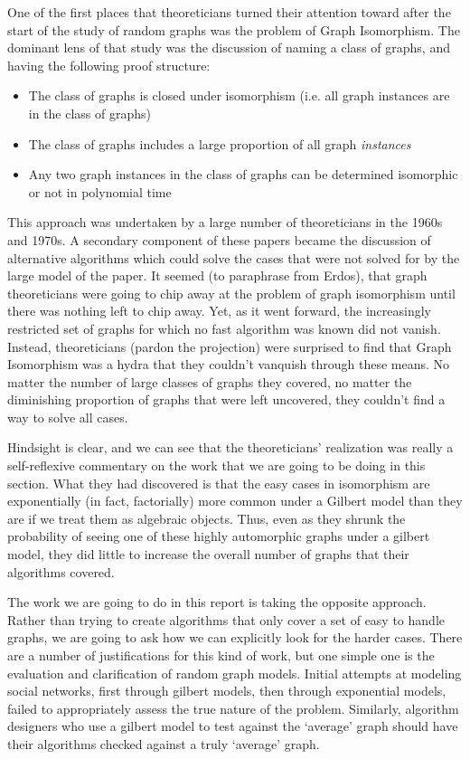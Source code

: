 \documentclass[11pt,a4paper]{report}
\begin{document}
One of the first places that theoreticians turned their attention toward after the start of the study of random graphs was the problem of Graph Isomorphism.
The dominant lens of that study was the discussion of naming a class of graphs, and having the following proof structure:
\begin{itemize}
\item{The class of graphs is closed under isomorphism (i.e. all graph instances are in the class of graphs)}
\item{The class of graphs includes a large proportion of all graph \emph{instances}}
\item{Any two graph instances in the class of graphs can be determined isomorphic or not in polynomial time}
\end{itemize}
This approach was undertaken by a large number of theoreticians in the 1960s and 1970s.
A secondary component of these papers became the discussion of alternative algorithms which could solve the cases that were not solved for by the large model of the paper.
It seemed (to paraphrase from Erdos), that graph theoreticians were going to chip away at the problem of graph isomorphism until there was nothing left to chip away.
Yet, as it went forward, the increasingly restricted set of graphs for which no fast algorithm was known did not vanish.
Instead, theoreticians (pardon the projection) were surprised to find that Graph Isomorphism was a hydra that they couldn't vanquish through these means.
No matter the number of large classes of graphs they covered, no matter the diminishing proportion of graphs that were left uncovered, they couldn't find a way to solve all cases.

Hindsight is clear, and we can see that the theoreticians' realization was really a self-reflexive commentary on the work that we are going to be doing in this section.
What they had discovered is that the easy cases in isomorphism are exponentially (in fact, factorially) more common under a Gilbert model than they are if we treat them as algebraic objects.
Thus, even as they shrunk the probability of seeing one of these highly automorphic graphs under a gilbert model, they did little to increase the overall number of graphs that their algorithms covered.

The work we are going to do in this report is taking the opposite approach.
Rather than trying to create algorithms that only cover a set of easy to handle graphs, we are going to ask how we can explicitly look for the harder cases.
There are a number of justifications for this kind of work, but one simple one is the evaluation and clarification of random graph models.
Initial attempts at modeling social networks, first through gilbert models, then through exponential models, failed to appropriately assess the true nature of the problem.
Similarly, algorithm designers who use a gilbert model to test against the `average' graph should have their algorithms checked against a truly `average' graph.
\end{document}
